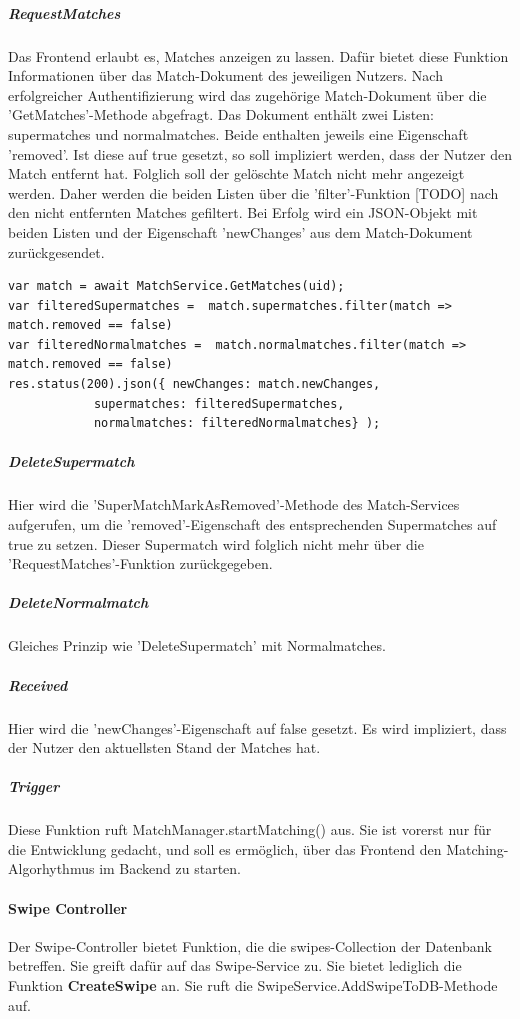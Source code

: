 \noindent
\subparagraph{RequestMatches} 
Das Frontend erlaubt es, Matches anzeigen zu lassen. Dafür bietet diese Funktion Informationen über das Match-Dokument des jeweiligen Nutzers. Nach erfolgreicher Authentifizierung wird das zugehörige Match-Dokument über die 'GetMatches'-Methode abgefragt. Das Dokument enthält zwei Listen: supermatches und normalmatches. Beide enthalten jeweils eine Eigenschaft 'removed'. Ist diese auf true gesetzt, so soll impliziert werden, dass der Nutzer den Match entfernt hat. Folglich soll der gelöschte Match nicht mehr angezeigt werden. Daher werden die beiden Listen über die 'filter'-Funktion [TODO] nach den nicht entfernten Matches gefiltert. Bei Erfolg wird ein JSON-Objekt mit beiden Listen und der Eigenschaft 'newChanges' aus dem Match-Dokument zurückgesendet.
 
\begin{lstlisting}[caption=MatchController - RequestMatches, label=lst:matchcontrollerrequestmatches]
var match = await MatchService.GetMatches(uid);
var filteredSupermatches =  match.supermatches.filter(match => match.removed == false)
var filteredNormalmatches =  match.normalmatches.filter(match => match.removed == false)
res.status(200).json({ newChanges: match.newChanges,
            supermatches: filteredSupermatches, 
            normalmatches: filteredNormalmatches} );
\end{lstlisting}

\noindent
\subparagraph{DeleteSupermatch} 
Hier wird die 'SuperMatchMarkAsRemoved'-Methode des Match-Services aufgerufen, um die 'removed'-Eigenschaft des entsprechenden Supermatches auf true zu setzen. Dieser Supermatch wird folglich nicht mehr über die 'RequestMatches'-Funktion zurückgegeben.

\noindent
\subparagraph{DeleteNormalmatch} 
Gleiches Prinzip wie 'DeleteSupermatch' mit Normalmatches.

\noindent
\subparagraph{Received} 
Hier wird die 'newChanges'-Eigenschaft auf false gesetzt. Es wird impliziert, dass der Nutzer den aktuellsten Stand der Matches hat.

\noindent
\subparagraph{Trigger} 
Diese Funktion ruft MatchManager.startMatching() aus. Sie ist vorerst nur für die Entwicklung gedacht, und soll es ermöglich, über das Frontend den Matching-Algorhythmus im Backend zu starten.

%
%


\paragraph{Swipe Controller}
Der Swipe-Controller bietet Funktion, die die swipes-Collection der Datenbank betreffen. Sie greift dafür auf das Swipe-Service zu.
Sie bietet lediglich die Funktion \textbf{CreateSwipe} an. Sie ruft die SwipeService.AddSwipeToDB-Methode auf.